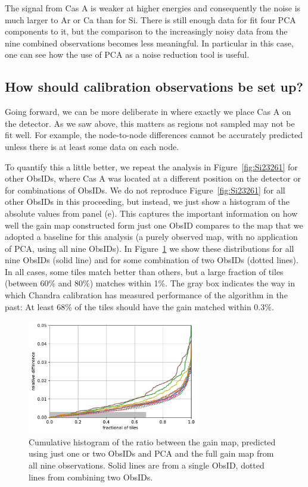 \documentclass[]{spie}  %
\begin{document}
The signal from Cas A is weaker at higher energies and consequently the noise is much larger to Ar or Ca than for Si. There is still enough data for fit four PCA components to it, but the comparison to the increasingly noisy data from the nine combined observations becomes less meaningful. In particular in this case, one can see how the use of PCA as a noise reduction tool is useful.

\subsection{How should calibration observations be set up?}
Going forward, we can be more deliberate in where exactly we place Cas A on the detector. As we saw above, this matters as regions not sampled may not be fit well. For example, the node-to-node differences cannot be accurately predicted unless there is at least some data on each node.

To quantify this a little better, we repeat the analysis in Figure~\ref{fig:Si23261} for other ObsIDs, where Cas A was located at a different position on the detector or for combinations of ObsIDs. We do not reproduce Figure~\ref{fig:Si23261} for all other ObsIDs in this proceeding, but instead, we just show a histogram of the absolute values from panel (e). This captures the important information on how well the gain map constructed form just one ObsID compares to the map that we adopted a baseline for this analysis (a purely observed map, with no application of PCA, using all nine ObsIDs). In Figure~\ref{fig:final} we show these distributions for all nine ObsIDs (solid line) and for some combination of two ObsIDs (dotted lines). In all cases, some tiles match better than others, but a large fraction of tiles (between 60\% and 80\%) matches within 1\%. The gray box indicates the way in which Chandra calibration has measured performance of the algorithm in the past: At least 68\% of the tiles should have the gain matched within 0.3\%.

\begin{figure} [ht]
  \begin{center}
    \includegraphics[height=5cm]{figures/final.pdf}
  \end{center}
  \caption
      {Cumulative histogram of the ratio between the gain map, predicted using just one or two ObsIDs and PCA and the full gain map from all nine observations. Solid lines are from a single ObsID, dotted lines from combining two ObsIDs.
        \label{fig:final}}
\end{figure}
\end{document}
